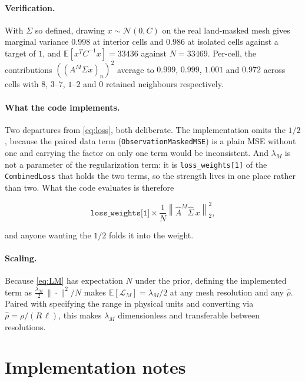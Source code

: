 \documentclass[11pt]{article}
\newcommand{\grid}{\ell}
\newcommand{\rhohat}{\hat{\rho}}
\newcommand{\Ahat}{\hat{A}}
\begin{document}
\paragraph{Verification.} With $\Sigma$ so defined, drawing $x \sim \mathcal{N}(0,C)$ on
the real land-masked mesh gives marginal variance $0.998$ at interior cells and $0.986$ at
isolated cells against a target of $1$, and
$\mathbb{E}\!\left[x^{T} C^{-1} x\right] = 33436$ against $N = 33469$. Per-cell, the
contributions $\left(\left(A^{M}\Sigma x\right)_n\right)^2$ average to $0.999$, $0.999$,
$1.001$ and $0.972$ across cells with $8$, $3$--$7$, $1$--$2$ and $0$ retained neighbours
respectively.

\paragraph{What the code implements.} Two departures from \eqref{eq:loss}, both
deliberate. The implementation omits the $1/2$, because the paired data term
(\texttt{ObservationMaskedMSE}) is a plain MSE without one and carrying the factor on
only one term would be inconsistent. And $\lambda_M$ is not a parameter of the
regularization term: it is \texttt{loss\_weights[1]} of the \texttt{CombinedLoss} that
holds the two terms, so the strength lives in one place rather than two. What the code
evaluates is therefore

\begin{equation}
\label{eq:implemented}
\texttt{loss\_weights[1]} \times \frac{1}{N}\left\|\Ahat^{M}\hat{\Sigma}\,x\right\|_2^2 ,
\end{equation}

and anyone wanting the $1/2$ folds it into the weight.

\paragraph{Scaling.} Because \eqref{eq:LM} has expectation $N$ under the prior, defining
the implemented term as $\tfrac{\lambda_M}{2}\,\|\cdot\|^2 / N$ makes
$\mathbb{E}[\mathcal{L}_M] = \lambda_M/2$ at any mesh resolution and any $\rhohat$. Paired
with specifying the range in physical units and converting via
$\rhohat = \rho/(R\,\grid)$, this makes $\lambda_M$ dimensionless and transferable
between resolutions.

\section{Implementation notes}
\label{sec:impl}
\end{document}
